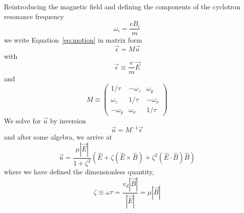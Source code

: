 \documentclass[twoside]{article}
\begin{document}
\begin{multicols}{2}
Reintroducing the magnetic field and defining the components of the cyclotron resonance frequency 
\begin{equation}
\omega_i =  \frac{e B_i}{m}
\end{equation}
we write Equation~\ref{eq:motion} in matrix form
\begin{equation}
\label{eq:mat}
\vec{\epsilon} = M\vec{u} 
\end{equation}
with
\begin{equation}
\vec{\epsilon} \equiv \frac{e}{m}\vec{E}
\end{equation}
and
\begin{equation}
 M \equiv 
\begin{pmatrix} 
1/\tau & -\omega_z  & \omega_y \\  
\omega_z & 1/\tau & -\omega_x \\
-\omega_y & \omega_x & 1/\tau
\end{pmatrix} 
\end{equation}
We solve for $\vec{u}$ by inversion
\begin{equation}
\vec{u} = M^{-1}\vec{\epsilon}  
\end{equation}
and after some algebra, we arrive at
\begin{equation}
\label{eq:start}
\vec{u} = \frac{\mu | \vec{E} |}{1 + \zeta^2}(\hat{E} + \zeta(\hat{E} \times \hat{B}) + \zeta^2(\hat{E} \cdot \hat{B})\hat{B} )
\end{equation}
where we have defined the dimensionless quantity,
\begin{equation}
\label{eq:zeta}
\zeta \equiv \omega \tau = \frac{v_d |\vec{B}|}{ | \vec{E} |} = \mu |\vec{B}|  
\end{equation}


\end{multicols}
\end{document}
